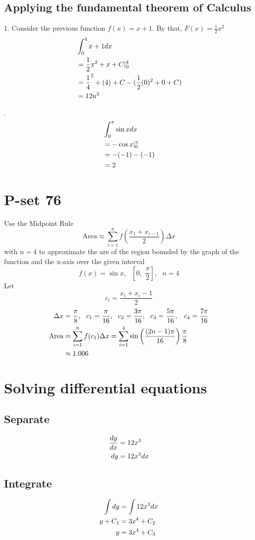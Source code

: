 \documentclass[11pt]{article}
\newcommand*{\vs}{\vspace{1cm}}
\newcommand*{\next}{\noindent}
\newcommand*{\set}{\setcounter{equation}{0}}
\begin{document}
\subsection{Applying the fundamental theorem of Calculus}
1. Consider the previous function $f(x)=x+1$. By that, $F(x)=\frac{1}{2}x^2$
\begin{align}
    \set
    &\int_{0}^{4}x+1dx\\
    &=\frac{1}{2}x^2+x+C|_{0}^{4}\\
    &=\frac{1}{4}^2+(4)+C-(\frac{1}{2}(0)^2+0+C)\\
    &=12u^2
\end{align}

\vs
\next
2. \begin{align}
    \set
    &\int_{0}^{\pi}\sin xdx\\
    &=-\cos x|_{0}^{\pi}\\
    &=-(-1)-(-1)\\
    &=2
\end{align}

\section{P-set 76}
Use the Midpoint Rule
\[\text{Area}\approx \sum_{i=1}^{n}f\left(\frac{x_1+x_{i-1}}{2}\right)\Delta x\]
with $n=4$ to approximate the are of the region bounded by the graph of the function and the x-axis over the given interval
\[f(x)=\sin x,\,\,\,\,\left[0,\,\,\frac{\pi}{2}\right],\,\,\,\, n=4\]
Let \[c_i=\frac{x_i+x_i-1}{2}\]
\begin{align}
    \set
    \Delta x&=\frac{\pi}{8},\,\,\,\, c_1=\frac{\pi}{16},\,\,\,\, c_2=\frac{3\pi}{16},\,\,\,\, c_3=\frac{5\pi}{16},\,\,\,\ c_4=\frac{7\pi}{16}\\
    \text{Area}&\approx \sum_{i=1}^{n}f(c_1)\Delta x=\sum_{i=1}^{4}\sin\left(\frac{(2n-1)\pi}{16}\right)\frac{\pi}{8}\\
    &\approx 1.006
\end{align}
\section{Solving differential equations}
\subsection{Separate}
\begin{align}
    \set
    \frac{dy}{dx}&=12x^3\\
    dy&=12x^3dx
\end{align}
\subsection{Integrate}
\begin{align}
    \set
    \int dy&=\int 12x^3dx\\
    y+C_1&=3x^4+C_2\\
    y&=3x^4+C_3
\end{align}
\end{document}
